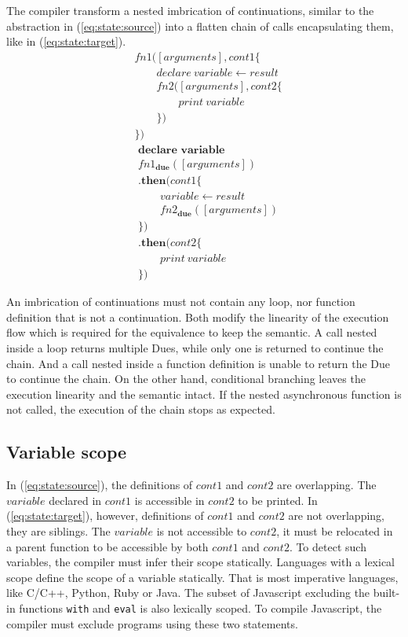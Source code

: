 The compiler transform a nested imbrication of continuations, similar to the abstraction in (\ref{eq:state:source}) into a flatten chain of calls encapsulating them, like in (\ref{eq:state:target}).
\begin{align} \label{eq:state:source}
&fn1([arguments], cont1 \{\nonumber\\
&\qquad  declare ~ variable \leftarrow result\nonumber\\
&\qquad  fn2([arguments], cont2 \{\nonumber\\
&\qquad\qquad    print ~ variable\nonumber\\
&\qquad  \})\nonumber\\
&\})
\end{align}
\begin{align} \label{eq:state:target}
&\textbf{declare variable}\nonumber\\
&fn1_\textbf{due}([arguments])\nonumber\\
&\textbf{.then}(cont1\{\nonumber\\
&\qquad  variable \leftarrow result\nonumber\\
&\qquad  fn2_\textbf{due}([arguments])\nonumber\\
&\})\nonumber\\
&\textbf{.then}(cont2\{\nonumber\\
&\qquad  print ~ variable\nonumber\\
&\})
\end{align}

An imbrication of continuations must not contain any loop, nor function definition that is not a continuation.
Both modify the linearity of the execution flow which is required for the equivalence to keep the semantic.
A call nested inside a loop returns multiple Dues, while only one is returned to continue the chain.
And a call nested inside a function definition is unable to return the Due to continue the chain.
On the other hand, conditional branching leaves the execution linearity and the semantic intact.
If the nested asynchronous function is not called, the execution of the chain stops as expected.

\subsection{Variable scope}

In (\ref{eq:state:source}), the definitions of $cont1$ and $cont2$ are overlapping.
The $variable$ declared in $cont1$ is accessible in $cont2$ to be printed.
In (\ref{eq:state:target}), however, definitions of $cont1$ and $cont2$ are not overlapping, they are siblings.
The $variable$ is not accessible to $cont2$, it must be relocated in a parent function to be accessible by both $cont1$ and $cont2$.
To detect such variables, the compiler must infer their scope statically.
Languages with a lexical scope define the scope of a variable statically.
That is most imperative languages, like C/C++, Python, Ruby or Java.
The subset of Javascript excluding the built-in functions \texttt{with} and \texttt{eval} is also lexically scoped.
To compile Javascript, the compiler must exclude programs using these two statements.